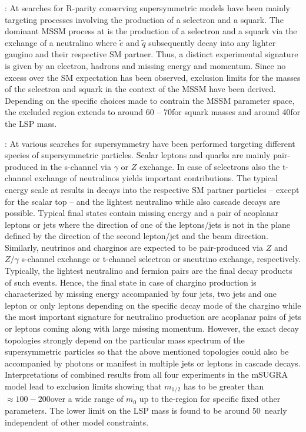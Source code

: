 \begin{description}
 \item \textbf{\hera \cite{Aid:1996es, Breitweg:1998gk}}: At \hera searches for R-parity conserving supersymmetric models have been mainly targeting processes involving the production of a selectron and a squark. The dominant MSSM process at \hera is the production of a selectron and a squark via the exchange of a neutralino where $\tilde{e}$ and $\tilde{q}$ subsequently decay into any lighter gaugino and their respective SM partner. Thus, a distinct experimental signature is given by an electron, hadrons and missing energy and momentum. Since no excess over the SM expectation has been observed, exclusion limits for the masses of the selectron and squark in the context of the MSSM have been derived. Depending on the specific choices made to contrain the MSSM parameter space, the excluded region extends to around 60 -- 70\gev for squark masses and around 40\gev for the LSP mass. 
 \item \textbf{\lep \cite{ALEPHSUSY, DELPHISUSY, L3SUSY, OPALSUSY, LEPLimits}}: At \lep various searches for supersymmetry have been performed targeting different species of supersymmetric particles. Scalar leptons and quarks are mainly pair-produced in the s-channel via $\gamma$ or $Z$ exchange. In case of selectrons also the t-channel exchange of neutralinos yields important contributions. The typical energy scale at \lep results in decays into the respective SM partner particles -- except for the scalar top -- and the lightest neutralino while also cascade decays are possible. Typical final states contain missing energy and a pair of acoplanar leptons or jets where the direction of one of the leptons/jets is not in the plane defined by the direction of the second lepton/jet and the beam direction. Similarly, neutrinos and charginos are expected to be pair-produced via $Z$ and $Z/\gamma$ s-channel exchange or t-channel selectron or sneutrino exchange, respectively. Typically, the lightest neutralino and fermion pairs are the final decay products of such events. Hence, the final state in case of chargino production is characterized by missing energy accompanied by four jets, two jets and one lepton or only leptons depending on the specific decay mode of the chargino while the most important signature for neutralino production are acoplanar pairs of jets or leptons coming along with large missing momentum. However, the exact decay topologies strongly depend on the particular mass spectrum of the supersymmetric particles so that the above mentioned topologies could also be accompanied by photons or manifest in multiple jets or leptons in cascade decays. Interpretations of combined results from all four experiments in the mSUGRA model lead to exclusion limits showing that $m_{1/2}$ has to be greater than $\approx 100 - 200$\gev over a wide range of $m_{0}$ up to the\tev-region for specific fixed other parameters. The lower limit on the LSP mass is found to be around 50~\gev nearly independent of other model constraints. 

\end{description}
